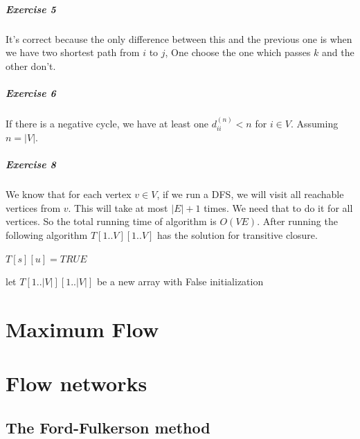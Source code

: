 \documentclass{book}
\begin{document}
	\paragraph{Exercise 5}
	It's correct because the only difference between this and the previous one is when we have two shortest path from $i$ to $j$, One choose the one which passes $k$ and the other don't.
	\paragraph{Exercise 6}
	If there is a negative cycle, we have at least one $d_{ii}^{(n)} < n$ for $i \in V$. Assuming $n = |V|$.
	\label{psec:floyd_warshall_exercise_8}
	\paragraph{Exercise 8}
	We know that for each vertex $v \in V$, if we run a DFS, we will visit all reachable vertices from $v$. This will take at most $|E| + 1$ times. We need that to do it for all vertices. So the total running time of algorithm is $O(VE)$. After running the following algorithm $T[1..V][1..V]$ has the solution for transitive closure.
	
	\begin{algorithm*}
		\begin{algorithmic}[1]
				\State $T[s][u] = TRUE$
						\State {}				
					\EndIf
				\EndFor
			\EndFunction
		\end{algorithmic}
	
		\begin{algorithmic}[1]
				\State let $T[1..|V|][1..|V|]$ be a new array with False initialization
					\State {}
				\EndFor
			\EndFunction
		\end{algorithmic}	
	\end{algorithm*}
	\FloatBarrier	
	\chapter{Maximum Flow}
	\chapter{Flow networks}
	\section{The Ford-Fulkerson method}
\end{document}
